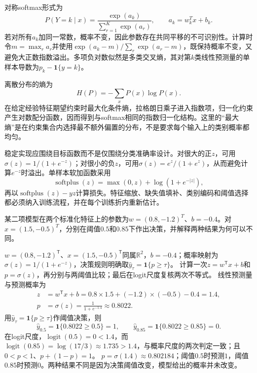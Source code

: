 对称softmax形式为
\[
P(Y=k\mid x)=\frac{\exp(a_k)}{\sum_{r=1}^{K}\exp(a_r)},
\qquad a_k=w_k^Tx+b_k.
\]
若对所有$a_k$加同一常数，概率不变，因此参数存在共同平移的不可识别性。计算时令$m=\max_r a_r$并使用$\exp(a_k-m)/\sum_r\exp(a_r-m)$，既保持概率不变，又避免大正数指数溢出。多项负对数似然是多类交叉熵，其对第$k$类线性预测量的单样本导数为$p_k-\mathbf1\{y=k\}$。

离散分布的熵为
\[
H(P)=-\sum_xP(x)\log P(x).
\]
在给定经验特征期望约束时最大化条件熵，拉格朗日乘子进入指数项，归一化约束产生对数配分函数，因而得到与softmax相同的指数归一化结构。这里的“最大熵”是在约束集合内选择最不额外偏置的分布，不是要求每个输入上的类别概率都均匀。


稳定实现应围绕目标函数而不是仅围绕分类准确率设计。对很大的正$z$，可用$\sigma(z)=1/(1+e^{-z})$；对很小的负$z$，可用$\sigma(z)=e^z/(1+e^z)$，从而避免计算$e^{-z}$时溢出。单样本软加函数采用
\[
\operatorname{softplus}(z)=\max(0,z)+\log(1+e^{-|z|}),
\]
再以$\operatorname{softplus}(z)-yz$计算损失。特征缩放、缺失值填补、类别编码和阈值选择都必须纳入训练流程，并在每个训练折内重新估计。

\label{struct:V2-C05-CH18}
\label{struct:V2-C05-CH32}
\begin{example}[一次概率预测与阈值决策]\label{exm:V2-C05-decision}
某二项模型在两个标准化特征上的参数为$w=(0.8,-1.2)^T$、$b=-0.4$。对$x=(1.5,-0.5)^T$，分别在阈值$0.5$和$0.85$下作出决策，并解释两种结果为何可以不同。

\label{struct:V2-C05-CH33}
\end{example}
\begin{solution}
\SolGiven $w=(0.8,-1.2)^{\mathsf T}$、$x=(1.5,-0.5)^{\mathsf T}$同属$\mathbb R^2$，$b=-0.4$；概率映射为$\sigma(z)=1/(1+e^{-z})$，决策规则明确取$\widehat y_\tau=\mathbf1\{p\geq\tau\}$。
\SolPlan 计算一次$z=w^{\mathsf T}x+b$和$p=\sigma(z)$，再分别与两阈值比较；最后在logit尺度复核两次不等式。
\SolDerive
线性预测量与预测概率为
\[
\begin{aligned}
z&=w^{\mathsf T}x+b
=0.8\times1.5+(-1.2)\times(-0.5)-0.4
=1.4,\\
p&=\sigma(z)=\frac{1}{1+e^{-1.4}}\approx0.8022.
\end{aligned}
\]
用$\widehat y_\tau=\mathbf1\{p\geq\tau\}$作阈值决策，则
\[
\widehat y_{0.5}=\mathbf1\{0.8022\geq0.5\}=1,
\qquad
\widehat y_{0.85}=\mathbf1\{0.8022\geq0.85\}=0.
\]
\SolCheck 在logit尺度，$\operatorname{logit}(0.5)=0<1.4$，而$\operatorname{logit}(0.85)=\log(17/3)\approx1.735>1.4$，与概率尺度的两次判定一致；且$0<p<1$、$p+(1-p)=1$。
\SolAnswer $p=\sigma(1.4)\approx0.802184$；阈值$0.5$时预测$1$，阈值$0.85$时预测$0$。两种结果不同是因为决策阈值改变，模型给出的概率并未改变。
\end{solution}

